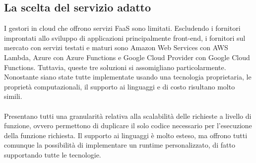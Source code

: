 \subsection{La scelta del servizio adatto}

I gestori in cloud che offrono servizi FaaS sono limitati.
Escludendo i fornitori improntati allo sviluppo di applicazioni principalmente front-end,
i fornitori sul mercato con servizi testati e maturi sono
Amazon Web Services con AWS Lambda, Azure con Azure Functions e Google Cloud Provider con Google Cloud Functions.
Tuttavia, queste tre soluzioni si assomigliano particolarmente.
Nonostante siano state tutte implementate usando una tecnologia proprietaria,
le proprietà computazionali, il supporto ai linguaggi e di costo risultano molto simili.\\
\\
Presentano tutti una granularità relativa alla scalabilità delle richieste a livello di funzione,
ovvero permettono di duplicare il solo codice necessario per l'esecuzione della funzione richiesta.
Il supporto ai linguaggi è molto esteso,
ma offrono tutti comunque la possibilità di implementare un runtime personalizzato,
di fatto supportando tutte le tecnologie.\\

